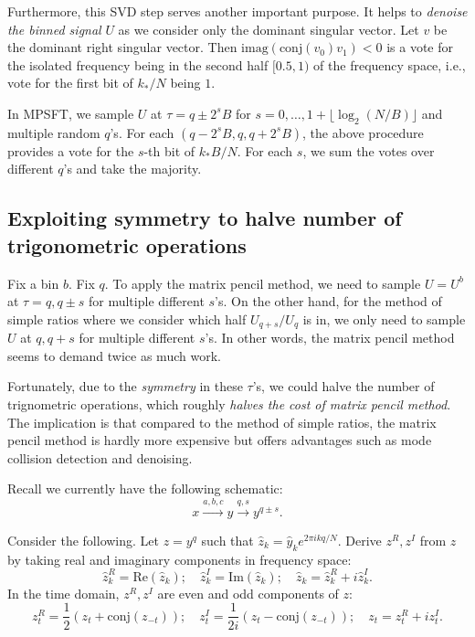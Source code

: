 \documentclass[10pt]{article}
\begin{document}
Furthermore, this SVD step serves another important purpose. It helps to \emph{denoise the binned signal} $U$ as we consider only the dominant singular vector. Let $v$ be the dominant right singular vector. Then $\text{imag}(\text{conj}(v_0)v_1)<0$ is a vote for the isolated frequency being in the second half $[0.5,1)$ of the frequency space, i.e., vote for the first bit of $k_*/N$ being $1$.

In MPSFT, we sample $U$ at $\tau=q \pm 2^s B$ for $s=0,\ldots,1 + \lfloor \log_2 (N/B) \rfloor$ and multiple random $q$'s. For each $(q-2^s B, q, q+2^s B)$, the above procedure provides a vote for the $s$-th bit of $k_* B/N$. For each $s$, we sum the votes over different $q$'s and take the majority.

\subsection{Exploiting symmetry to halve number of trigonometric operations}\label{sec:symmetry}

Fix a bin $b$. Fix $q$. To apply the matrix pencil method, we need to sample $U=U^b$ at $\tau=q, q\pm s$ for multiple different $s$'s. On the other hand, for the method of simple ratios where we consider which half $U_{q+s}/U_q$ is in, we only need to sample $U$ at $q, q+s$ for multiple different $s$'s. In other words, the matrix pencil method seems to demand twice as much work.

Fortunately, due to the \emph{symmetry} in these $\tau$'s, we could halve the number of trignometric operations, which roughly \emph{halves the cost of matrix pencil method}. The implication is that compared to the method of simple ratios, the matrix pencil method is hardly more expensive but offers advantages such as mode collision detection and denoising.

Recall we currently have the following schematic:
$$x \xrightarrow{a,b,c}{y} \xrightarrow{q,s} y^{q\pm s}.$$

Consider the following. Let $z=y^q$ such that $\hat{z}_k = \hat{y}_k e^{2\pi i k q/N}$. Derive $z^R, z^I$ from $z$ by taking real and imaginary components in frequency space:
$$\hat{z}^R_k=\text{Re}(\hat{z}_k); \quad \hat{z}^I_k = \text{Im}(\hat{z}_k); \quad \hat{z}_k = \hat{z}_k^R + i \hat{z}_k^I.$$
In the time domain, $z^R,z^I$ are even and odd components of $z$:
$$z^R_t = \frac{1}{2}(z_t + \text{conj}(z_{-t})); \quad z^I_t = \frac{1}{2i}(z_t - \text{conj}(z_{-t})); \quad z_t = z_t^R + i z_t^I.$$
\end{document}
